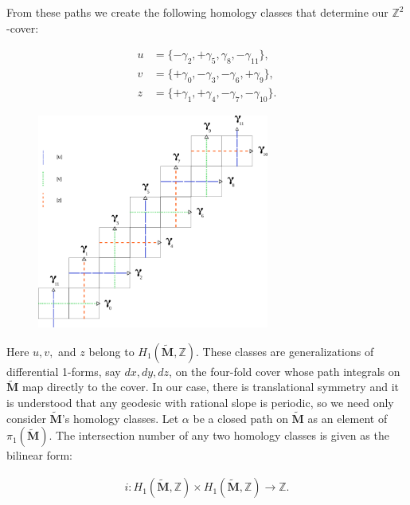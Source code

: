 \documentclass[]{article}
\begin{document}
From these paths we create the following homology classes that determine our $\mathbb{Z}^2$-cover:

\begin{align*}
u&= \{-\gamma_2, +\gamma_5,\gamma_8,-\gamma_{11}\},\\
v&= \{+\gamma_0, -\gamma_3,-\gamma_6,+\gamma_{9}\},\\
z&= \{+\gamma_1, +\gamma_4,-\gamma_7,-\gamma_{10}\}.
\end{align*}

\begin{figure}[H]
\includegraphics[width=3in]{homologyclass.png}
\centering
\end{figure}

Here $u,v,$ and $z$ belong to $H_1(\tilde{\mathbf{M}},\mathbb Z)$. These classes are generalizations of differential 1-forms, say $dx,dy,dz$, on the four-fold cover whose path integrals on $\tilde{\mathbf{M}}$ map directly to the cover.  In our case, there is translational symmetry and it is understood that any geodesic with rational slope is periodic, so we need only consider $\tilde{\mathbf{M}}$'s homology classes. Let $\alpha$ be a closed path on $\tilde{\mathbf{M}}$ as an element of $\pi_1(\tilde{\mathbf{M}})$. The intersection number of any two homology classes is given as the bilinear form:

\begin{align}
i:H_1(\tilde{\mathbf{M}},\mathbb Z)\times H_1(\tilde{\mathbf{M}},\mathbb Z)\rightarrow \mathbb Z.
\end{align}
\end{document}
